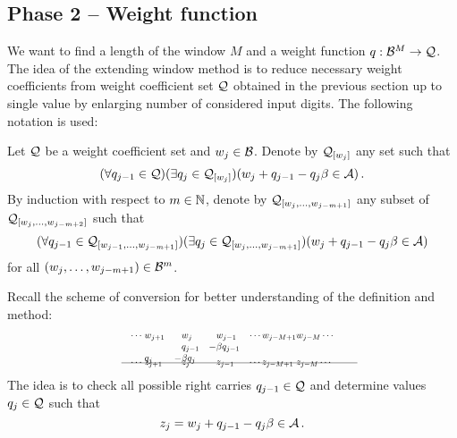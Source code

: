     
    





\subsection{Phase 2 -- Weight function}
    We want to find a length of the window $M$ and a weight function $q:\mathcal{B}^{M} \to \mathcal{Q}$. The idea of the extending window method is to reduce necessary weight coefficients from weight coefficient set $\mathcal{Q}$ obtained in the previous section up to single value by enlarging number of considered input digits. The following notation is used: 
    \begin{defn}
        Let $\mathcal{Q}$ be a weight coefficient set and $w_j\in \mathcal{B}$. Denote by $\mathcal{Q}_{[w_j]}$ any set such that
        $$
            (\forall q_{j-1} \in \mathcal{Q})(\exists q_j \in \mathcal{Q}_{[w_j]})(w_j + q_{j-1} - q_j \beta \in \mathcal{A})\,.
        $$
        By induction with respect to $m \in \mathbb{N}$, denote by $\mathcal{Q}_{[w_{j},\dots, w_{j-m+1}]}$ any subset of  $\mathcal{Q}_{[w_{j},\dots, w_{j-m+2}]}$ such that 
        $$
           (\forall q_{j-1} \in \mathcal{Q}_{[w_{j-1},\dots, w_{j-m+1}]})(\exists q_j \in \mathcal{Q}_{[w_{j},\dots, w_{j-m+1}]})(w_j + q_{j-1} - q_j \beta \in \mathcal{A})
        $$
        for all $(w_{j},\dots, w_{j-m+1})\in \mathcal{B}^{m}$.
    \end{defn}
  
    Recall the scheme of conversion for better understanding of the definition and method:
    \begin{align*}
        \hspace{130pt}\cdots\; &w_{j+1}&\!\! &w_j  & \!\!  &w_{j-1}&\cdots w_{j-M+1} &w_{j-M}\cdots \hspace{130pt} \\[-3pt] 
                         & &       &q_{j-1}& -&\beta q_{j-1} \\[-3pt]
                           &q_j&   -&\beta q_j &&\\[-15pt]      
    \intertext{\hspace{120pt}\line(1,0){250}} 
          \vspace{-15pt}
          \\[-30pt]
     \cdots\; &z_{j+1}& &z_j& &z_{j-1}& \cdots z_{j-M+1}\; &z_{j-M}\cdots                     
    \end{align*}     
    The idea is to check all possible right carries $q_{j-1}\in\mathcal{Q}$ and determine values $q_j\in\mathcal{Q}$ such that 
    $$
    z_j=w_j + q_{j-1} - q_j \beta \in \mathcal{A} \,.
    $$  
    
